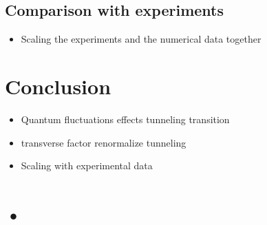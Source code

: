 \documentclass[prb,twocolumn,showpacs,preprintnumbers,amsmath,amssymb, superscriptaddress]{revtex4-2}
\newcommand{\1}{{1\hspace*{-0.5ex} \textrm{l} \hspace*{0.5ex}}}
\begin{document}
\subsection{Comparison with experiments}
\begin{itemize}
\item Scaling the experiments and the numerical data together
\end{itemize}

	
\section{Conclusion}
\begin{itemize}
\item Quantum fluctuations effects tunneling transition
\item transverse factor renormalize tunneling
\item Scaling with experimental data
\end{itemize}  
 
\appendix
\section{•}


\end{document}
